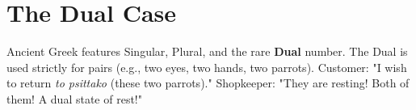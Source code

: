 \documentclass[10pt, compress]{beamer}
\begin{document}
\section{The Dual Case}


  {Ancient Greek features Singular, Plural, and the rare \textbf{Dual} number.}
  {The Dual is used strictly for pairs (e.g., two eyes, two hands, two parrots).}
  {Customer: "I wish to return \textit{to psittako} (these two parrots)."}
  {Shopkeeper: "They are resting! Both of them! A dual state of rest!"}
\end{document}
